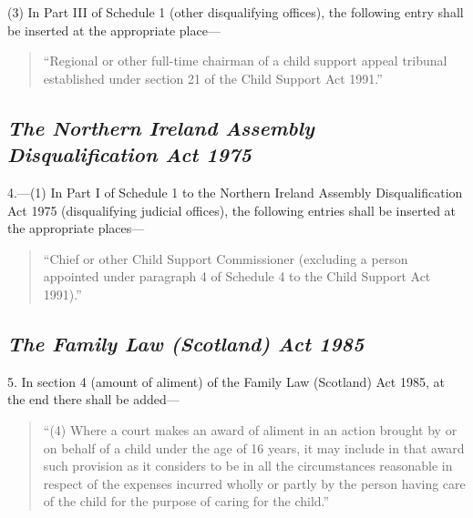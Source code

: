 \documentclass[12pt,a4paper]{article}
\begin{document}
(3) In Part III 
of Schedule 1  %
(other disqualifying offices), the following entry shall be inserted at the appropriate place— 
\begin{quotation}
“Regional or other full-time chairman of a child support appeal tribunal established under section 21 of the Child Support Act 1991.''
\end{quotation}


\subsection*{\itshape The Northern Ireland Assembly Disqualification Act 1975}

4.---(1) In Part I of 
Schedule 1 to  %
the Northern Ireland Assembly Disqualification Act 1975 (disqualifying judicial offices), the following entries shall be inserted at the appropriate places— 
\begin{quotation}
“Chief or other Child Support Commissioner (excluding a person appointed under paragraph 4 of Schedule 4 to the Child Support Act 1991).''
\end{quotation}


\subsection*{\itshape The Family Law (Scotland) Act 1985}

5. In section 4 (amount of aliment) of the Family Law (Scotland) Act 1985, at the end there shall be added—
\begin{quotation}
“(4) Where a court makes an award of aliment in an action brought by or on behalf of a child under the age of 16 years, it may include in that award such provision as it considers to be in all the circumstances reasonable in respect of the expenses incurred wholly or partly by the person having care of the child for the purpose of caring for the child.”
\end{quotation}
\end{document}
